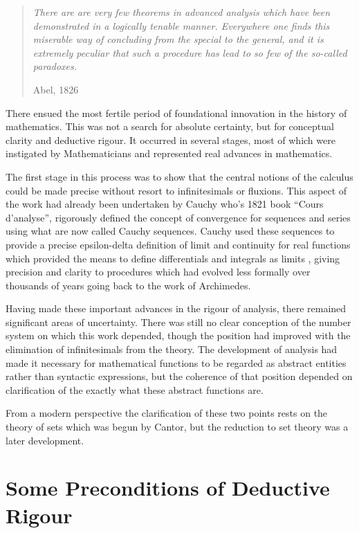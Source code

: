 \documentclass[10pt,titlepage]{book}
\begin{document}
\begin{quotation}
  \emph{There are are very few theorems in advanced analysis which have been demonstrated in a logically tenable manner. Everywhere one finds this miserable way of concluding from the special to the general, and it is extremely peculiar that such a procedure has lead to so few of the so-called paradoxes.}

Abel, 1826
\end{quotation}

There ensued the most fertile period of foundational innovation in the history of mathematics.
This was not a search for absolute certainty, but for conceptual clarity and deductive rigour.
It occurred in several stages, most of which were instigated by Mathematicians and represented real advances in mathematics.

The first stage in this process was to show that the central notions of the calculus could be made precise without resort to infinitesimals or fluxions.
This aspect of the work had already been undertaken by Cauchy who's 1821 book ``Cours d'analyse''\cite{bradley2010cauchy}, rigorously defined the concept of convergence for sequences and series using what are now called Cauchy sequences.
Cauchy used these sequences to provide a precise epsilon-delta definition of limit and continuity for real functions which provided the means to  define differentials and integrals as limits \cite{cates2019cauchy}, giving precision and clarity to procedures which had evolved less formally over thousands of years going back to the work of Archimedes.

Having made these important advances in the rigour of analysis, there remained significant areas of uncertainty.
There was still no clear conception of the number system on which this work depended, though the position had improved with the elimination of infinitesimals from the theory.
The development of analysis had made it necessary for mathematical functions to be regarded as abstract entities rather than syntactic expressions, but the coherence of that position depended on clarification of the exactly what these abstract functions are.

From a modern perspective the clarification of these two points rests on the theory of sets which was begun by Cantor, but the reduction to set theory was a later development.

\section{Some Preconditions of Deductive Rigour}
\end{document}
